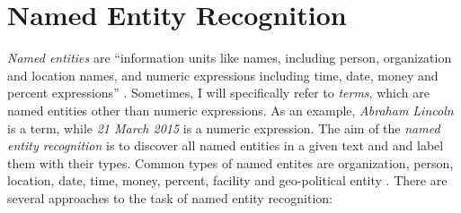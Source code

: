 \documentclass[12pt, twoside]{fithesis2}		%
\renewcommand{\_}{\leavevmode \kern0.07em\vbox{\hrule width0.4em}}
\begin{document}



\section{Named Entity Recognition}
\label{sec:terms-extraction}
\textit{Named entities}
are ``information units like names, including person, organization and location names, and numeric expressions including time, date, money and percent expressions'' \autocite{named-entity-recognition}.
Sometimes, I will specifically refer to \textit{terms}, which are named entities other than numeric expressions.
As an example, \textit{Abraham Lincoln} is a term, while \textit{21 March 2015} is a numeric expression.
The aim of the \textit{named entity recognition} is to discover all named entities in a given text and and label them with their types. Common types of named entites are organization, person, location, date, time, money, percent, facility and geo-political entity \cite[][281]{nlp-python}. There are several approaches to the task of named entity recognition:
\end{document}
